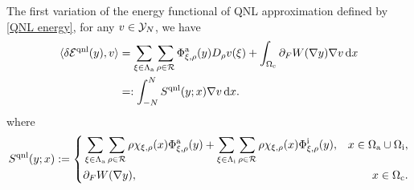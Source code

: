 

The first variation of the energy functional of QNL approximation defined by \eqref{QNL energy}, for any $v\in \mathcal{Y}_N$, we have 
\begin{equation}\label{QNL first variation}
	\begin{split}
		\langle \delta \mathcal{E}^{{\rm qnl}} (y), v\rangle &= \sum_{\xi \in \Lambda_{\rm a}} \sum_{\rho \in \mathcal{R}} \Phi^{{\rm a}}_{\xi,\rho}(y)D_{\rho}v(\xi) + \int_{\Omega_{{\rm c}}}\partial_{F} W(\nabla y)\nabla v\,\text{d} x \\
		&=: \int_{-N}^{N} S^{{\rm qnl}}(y;x) \nabla v \,\text{d} x.
	\end{split}
\end{equation}
where
\begin{equation}\label{QNL stress tensor}
	S^{{\rm qnl}}(y;x) := \left\{
	\begin{aligned}
		&\sum_{\xi \in \Lambda_{\rm a}}\sum_{\rho \in \mathcal{R}}\rho \chi_{\xi,\rho}(x) \Phi^{{\rm a}}_{\xi,\rho}(y) +\sum_{\xi \in \Lambda_{\rm i}}\sum_{\rho \in \mathcal{R}}\rho \chi_{\xi,\rho}(x) \Phi^{{\rm i}}_{\xi,\rho}(y), &x\in \Omega_{{\rm a}} \cup \Omega_{{\rm i}}, \\
		&\partial_{F}W(\nabla y), &x\in \Omega_{{\rm c}}.
	\end{aligned}
	\right.
\end{equation}



